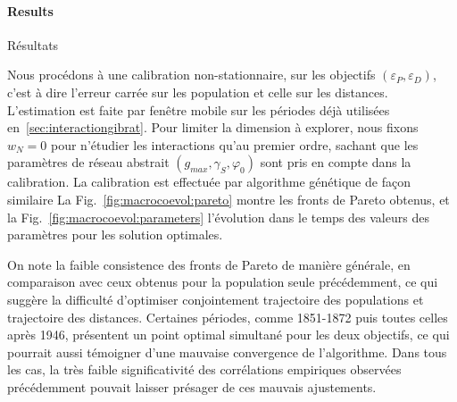 




\paragraph{Results}{Résultats}


Nous procédons à une calibration non-stationnaire, sur les objectifs $(\varepsilon_P,\varepsilon_D)$, c'est à dire l'erreur carrée sur les population et celle sur les distances. L'estimation est faite par fenêtre mobile sur les périodes déjà utilisées en~\ref{sec:interactiongibrat}. Pour limiter la dimension à explorer, nous fixons $w_N = 0$ pour n'étudier les interactions qu'au premier ordre, sachant que les paramètres de réseau abstrait $(g_{max},\gamma_S,\varphi_0)$ sont pris en compte dans la calibration. La calibration est effectuée par algorithme génétique de façon similaire La Fig.~\ref{fig:macrocoevol:pareto} montre les fronts de Pareto obtenus, et la Fig.~\ref{fig:macrocoevol:parameters} l'évolution dans le temps des valeurs des paramètres pour les solution optimales.


On note la faible consistence des fronts de Pareto de manière générale, en comparaison avec ceux obtenus pour la population seule précédemment, ce qui suggère la difficulté d'optimiser conjointement trajectoire des populations et trajectoire des distances. Certaines périodes, comme 1851-1872 puis toutes celles après 1946, présentent un point optimal simultané pour les deux objectifs, ce qui pourrait aussi témoigner d'une mauvaise convergence de l'algorithme. Dans tous les cas, la très faible significativité des corrélations empiriques observées précédemment pouvait laisser présager de ces mauvais ajustements.


